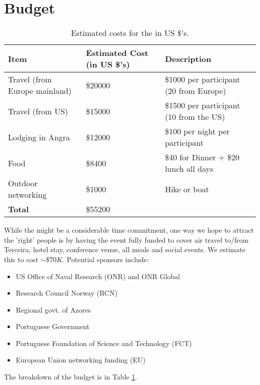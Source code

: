 \section{Budget}
\label{sec:budget}

\begin{table}[!]
  \centering
  \begin{tabular}{|p{4cm}|p{2.5cm}|p{7cm}|}
    \hline 
    \rowcolor{Gray}
    \bfseries Item& \bfseries Estimated Cost (in US \$'s)&\bfseries Description\\
    \hline
    Travel (from Europe mainland)& \$20000 & \$1000 per participant (20 from Europe) \\
    \hline
    Travel (from US)& \$15000 & \$1500 per participant (10 from the US) \\
    \hline
    Lodging in Angra & \$12000 & \$100 per night per participant \\
    \hline
    Food& \$8400 & \$40 for Dinner + \$20 lunch all days\\
    \hline
    Outdoor networking& \$1000 & Hike or boat\\
    \hline
    \textbf{Total}& \$55200 &\\
    \hline        
  \end{tabular}
  \caption{Estimated costs for the \symp in US \$'s.}
  \label{tab:budget}
\end{table}

While the \symp might be a considerable time commitment, one way we hope
to attract the 'right' people is by having the event fully funded to
cover air travel to/from Terceira, hotel stay, conference venue, all
meals and social events. We estimate this to cost $\sim
\$70K$. Potential sponsors include:

\begin{itemize}[noitemsep,topsep=0pt,parsep=0pt,partopsep=0pt]

  \item US Office of Naval Research (ONR) and ONR Global
  \item Research Council Norway (RCN)
  \item Regional govt. of Azores
  \item Portuguese Government
  \item Portuguese Foundation of Science and Technology (FCT)
  \item European Union networking funding (EU)

\end{itemize}

The breakdown of the budget is in Table \ref{tab:budget}.
